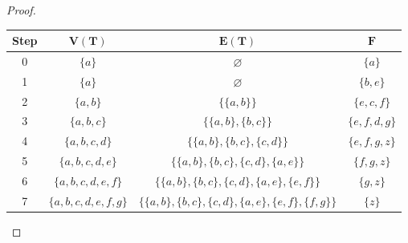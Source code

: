 \documentclass[14pt]{extarticle}
\newcommand{\es}{\varnothing}
\newcommand{\cy}{\color{cyan}}
\begin{document}
\begin{proof}
    \begin{center}
        \begin{tabular}{|c|c|c|c|}
            \hline
            {\bf \cy Step} & {\cy \(\bm{V(T)}\)}   & {\cy \(\bm{E(T)}\)}                                          & {\cy \(\bm{F}\)} \\
            \hline
            0              & \(\{a\}\)             & \(\es\)                                                      & \(\{a\}\)        \\
            1              & \(\{a\}\)             & \(\es\)                                                      & \(\{b,e\}\)      \\
            2              & \(\{a,b\}\)           & \(\{\{a,b\}\}\)                                              & \(\{e,c,f\}\)    \\
            3              & \(\{a,b,c\}\)         & \(\{\{a,b\}, \{b,c\}\}\)                                     & \(\{e,f,d,g\}\)  \\
            4              & \(\{a,b,c,d\}\)       & \(\{\{a,b\}, \{b,c\}, \{c,d\}\}\)                            & \(\{e,f,g,z\}\)  \\
            5              & \(\{a,b,c,d,e\}\)     & \(\{\{a,b\}, \{b,c\}, \{c,d\}, \{a,e\}\}\)                   & \(\{f,g,z\}\)    \\
            6              & \(\{a,b,c,d,e,f\}\)   & \(\{\{a,b\}, \{b,c\}, \{c,d\}, \{a,e\}, \{e,f\}\}\)          & \(\{g,z\}\)      \\
            7              & \(\{a,b,c,d,e,f,g\}\) & \(\{\{a,b\}, \{b,c\}, \{c,d\}, \{a,e\}, \{e,f\}, \{f,g\}\}\) & \(\{z\}\)        \\
            \hline
        \end{tabular}


\end{center}
\end{proof}
\end{document}
